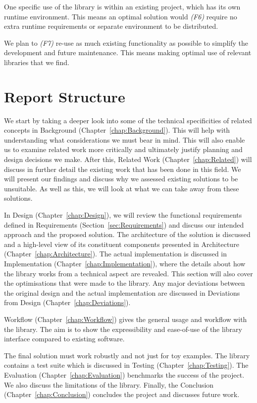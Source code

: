 One specific use of the library is within an existing project, which has its own runtime environment. This means an optimal solution would \emph{(F6)} require no extra runtime requirements or separate environment to be distributed.

We plan to \emph{(F7)} re-use as much existing functionality as possible to simplify the development and future maintenance. This means making optimal use of relevant libraries that we find.

\section{Report Structure}

We start by taking a deeper look into some of the technical specificities of related concepts in Background (Chapter~\ref{chap:Background}). This will help with understanding what considerations we must bear in mind. This will also enable us to examine related work more critically and ultimately justify planning and design decisions we make. After this, Related Work (Chapter~\ref{chap:Related}) will discuss in further detail the existing work that has been done in this field. We will present our findings and discuss why we assessed existing solutions to be unsuitable. As well as this, we will look at what we can take away from these solutions.

In Design (Chapter~\ref{chap:Design}), we will review the functional requirements defined in Requirements (Section~\ref{sec:Requirements}) and discuss our intended approach and the proposed solution. The architecture of the solution is discussed and a high-level view of its constituent components presented in Architecture (Chapter~\ref{chap:Architecture}). The actual implementation is discussed in Implementation (Chapter~\ref{chap:Implementation}), where the details about how the library works from a technical aspect are revealed. This section will also cover the optimisations that were made to the library. Any major deviations between the original design and the actual implementation are discussed in Deviations from Design (Chapter~\ref{chap:Deviations}).

Workflow (Chapter~\ref{chap:Workflow}) gives the general usage and workflow with the library. The aim is to show the expressibility and ease-of-use of the library interface compared to existing software.

The final solution must work robustly and not just for toy examples. The library contains a test suite which is discussed in Testing (Chapter~\ref{chap:Testing}). The Evaluation (Chapter~\ref{chap:Evaluation}) benchmarks the success of the project. We also discuss the limitations of the library. Finally, the Conclusion (Chapter~\ref{chap:Conclusion}) concludes the project and discusses future work.